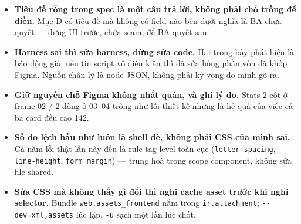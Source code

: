 \begin{itemize}
  \item \textbf{Tiêu đề rỗng trong spec là một câu trả lời, không phải chỗ trống để điền.} Mục D có
    tiêu đề mà không có field nào bên dưới nghĩa là BA chưa quyết --- dựng UI trước, chừa seam, để BA
    quyết sau.
  \item \textbf{Harness sai thì sửa harness, đừng sửa code.} Hai trong bảy phát hiện là báo động giả;
    nếu tin script vô điều kiện thì đã sửa hỏng phần vốn đã khớp Figma. Nguồn chân lý là node JSON,
    không phải kỳ vọng do mình gõ ra.
  \item \textbf{Giữ nguyên chỗ Figma không nhất quán, và ghi lý do.} Stats 2 cột ở frame 02 / 2 dòng
    ở 03--04 trông như lỗi thiết kế nhưng là hệ quả của việc cả ba card đều cao 142.
  \item \textbf{Số đo lệch hầu như luôn là shell đè, không phải CSS của mình sai.} Cả năm lỗi thật
    lần này đều là rule tag-level toàn cục (\texttt{letter-spacing}, \texttt{line-height},
    \texttt{form margin}) --- trung hoà trong scope component, không sửa file shared.
  \item \textbf{Sửa CSS mà không thấy gì đổi thì nghi cache asset trước khi nghi selector.} Bundle
    \texttt{web.assets\_frontend} nằm trong \texttt{ir.attachment}; \texttt{-{}-dev=xml,assets} lúc
    lặp, \texttt{-u} sạch một lần lúc chốt.
\end{itemize}
